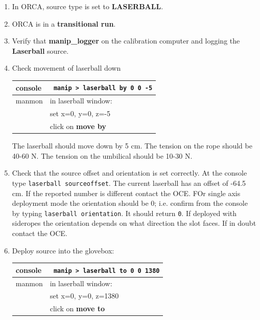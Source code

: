 \documentclass[11pt]{article}
\begin{document}
\begin{enumerate}
\item \CheckBox[name=rluo38]{} In ORCA, source type is set to {\bf LASERBALL}.
\item \CheckBox[name=rluo39]{} ORCA is in a {\bf transitional run}.
\item \CheckBox[name=rluo40]{} Verify that {\bf manip\_logger} on the calibration computer and logging the {\bf Laserball} source.
\item \CheckBox[name=rluo41]{} Check movement of laserball down
\begin{center}
\begin{tabular}{|l|l|}
\hline
console & \verb+ manip > laserball by 0 0 -5+ \\
\hline
manmon & in laserball window: \\ &  set x=0, y=0, z=-5 \\ & click on {\bf move by} \\
\hline
\end{tabular}
\end{center}
The laserball should move down by 5 cm. The tension on the rope should be 40-60 N. The tension on the umbilical should be 10-30 N.
\item \CheckBox[name=rluo42]{} Check that the source offset and orientation is set correctly. At the console type \verb+laserball sourceoffset+. The current laserball has an offset of -64.5 cm. If the reported number is different contact the OCE. FOr single axis deployment mode the orientation should be 0; i.e. confirm from the console by typing \verb+laserball orientation+. It should return \verb+0+. If deployed with sideropes the orientation depends on what direction the slot faces. If in doubt contact the OCE.
\item \CheckBox[name=rluo43]{} Deploy source into the glovebox:
\begin{center}
\begin{tabular}{|l|l|}
\hline
console & \verb+ manip > laserball to 0 0 1380+ \\
\hline
manmon & in laserball window: \\ &  set x=0, y=0, z=1380 \\ & click on {\bf move to} \\
\hline
\end{tabular}
\end{center}


\end{enumerate}
\end{document}
